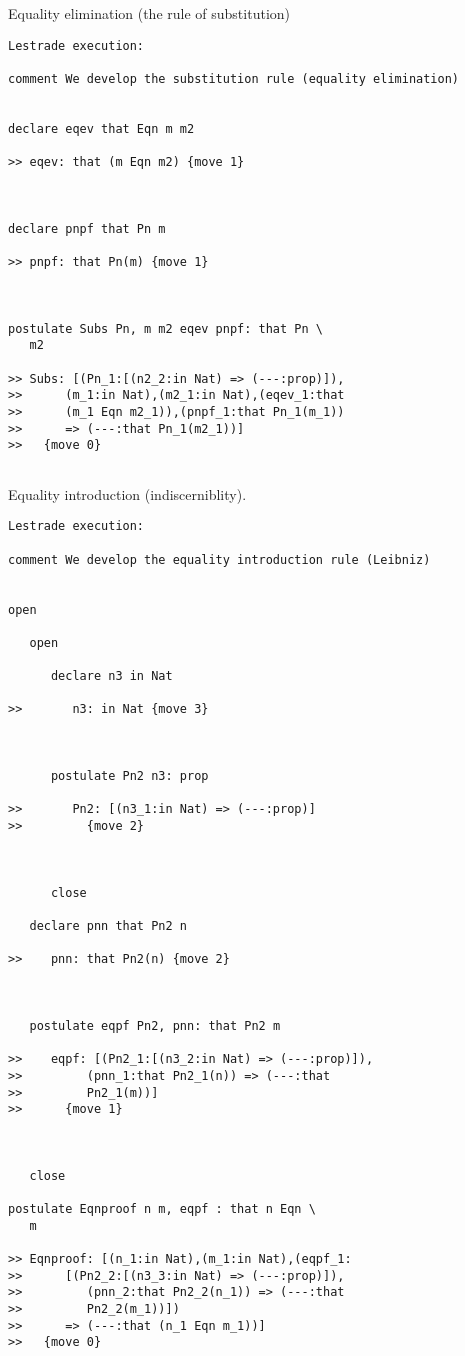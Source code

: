 \documentclass[12pt]{article}
\begin{document}
Equality elimination (the rule of substitution)

\begin{verbatim}Lestrade execution:

comment We develop the substitution rule (equality elimination)


declare eqev that Eqn m m2

>> eqev: that (m Eqn m2) {move 1}



declare pnpf that Pn m

>> pnpf: that Pn(m) {move 1}



postulate Subs Pn, m m2 eqev pnpf: that Pn \
   m2

>> Subs: [(Pn_1:[(n2_2:in Nat) => (---:prop)]),
>>      (m_1:in Nat),(m2_1:in Nat),(eqev_1:that
>>      (m_1 Eqn m2_1)),(pnpf_1:that Pn_1(m_1))
>>      => (---:that Pn_1(m2_1))]
>>   {move 0}


\end{verbatim}

Equality introduction (indiscerniblity).

\begin{verbatim}Lestrade execution:

comment We develop the equality introduction rule (Leibniz)


open

   open

      declare n3 in Nat

>>       n3: in Nat {move 3}



      postulate Pn2 n3: prop

>>       Pn2: [(n3_1:in Nat) => (---:prop)]
>>         {move 2}



      close

   declare pnn that Pn2 n

>>    pnn: that Pn2(n) {move 2}



   postulate eqpf Pn2, pnn: that Pn2 m

>>    eqpf: [(Pn2_1:[(n3_2:in Nat) => (---:prop)]),
>>         (pnn_1:that Pn2_1(n)) => (---:that
>>         Pn2_1(m))]
>>      {move 1}



   close

postulate Eqnproof n m, eqpf : that n Eqn \
   m

>> Eqnproof: [(n_1:in Nat),(m_1:in Nat),(eqpf_1:
>>      [(Pn2_2:[(n3_3:in Nat) => (---:prop)]),
>>         (pnn_2:that Pn2_2(n_1)) => (---:that
>>         Pn2_2(m_1))])
>>      => (---:that (n_1 Eqn m_1))]
>>   {move 0}


\end{verbatim}
\end{document}

